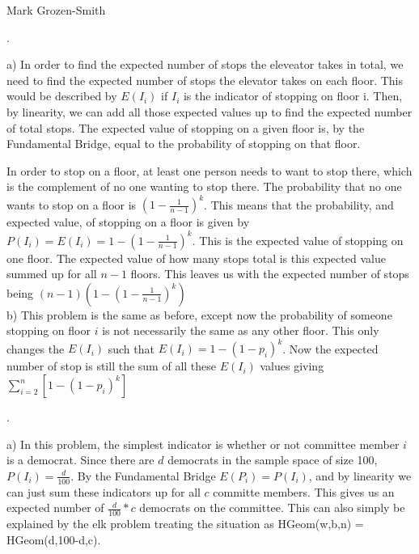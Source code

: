 \documentclass[11pt]{article}
\begin{document}
 \hfill Mark Grozen-Smith

\bigskip

.

	a) In order to find the expected number of stops the eleveator takes in total, we need to find the expected number of stops the elevator takes on each floor. This would be described by $E(I_i)$ if $I_i$ is the indicator of stopping on floor i. Then, by linearity, we can add all those expected values up to find the expected number of total stops.  The expected value of stopping on a given floor is, by the Fundamental Bridge, equal to the probability of stopping on that floor.  

    In order to stop on a floor, at least one person needs to want to stop there, which is the complement of no one wanting to stop there.  The probability that no one wants to stop on a floor is  $(1-\frac{1}{n-1})^k$.  This means that the probability, and expected value, of stopping on a floor is given by $P(I_i) = E(I_i) = 1-(1-\frac{1}{n-1})^k$.  This is the expected value of stopping on one floor.  The expected value of how many stops total is this expected value summed up for all $n-1$ floors.  This leaves us with the expected number of stops being $\boxed{(n-1)(1-(1-\frac{1}{n-1})^k)}$\\

\smallskip
    b) This problem is the same as before, except now the probability of someone stopping on floor $i$ is not necessarily the same as any other floor.  This only changes the $E(I_i)$ such that $E(I_i) = 1-(1-p_i)^k$.  Now the expected number of stop is still the sum of all these $E(I_i)$ values giving $\boxed{\sum\limits_{i=2}^{n} [1-(1-p_i)^k]}$
\bigskip

.

	a) In this problem, the simplest indicator is whether or not committee member $i$ is a democrat.  Since there are $d$ democrats in the sample space of size 100, $P(I_i) = \frac{d}{100}$. By the Fundamental Bridge $E(P_i) = P(I_i)$, and by linearity we can just sum these indicators up for all $c$ committe members.  This gives us an expected number of $\boxed{\frac{d}{100}*c}$ democrats on the committee. This can also simply be explained by the elk problem treating the situation as HGeom(w,b,n) = HGeom(d,100-d,c).\\
\smallskip
\end{document}
